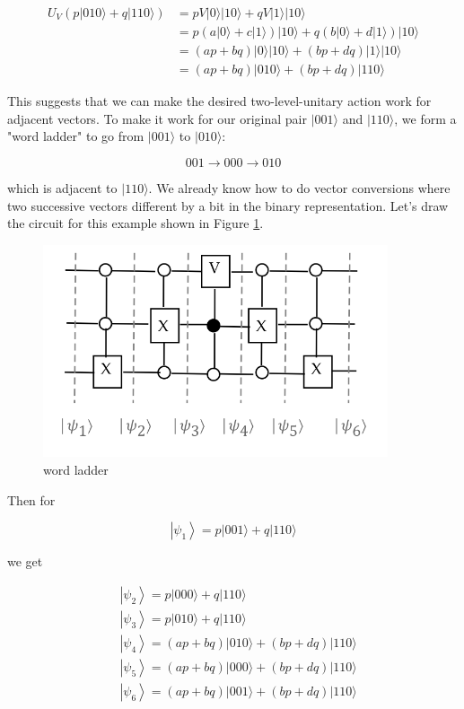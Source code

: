 \documentclass[main.tex]{subfiles}
\begin{document}
    $$
    \begin{aligned}
    U_{V}(p|010\rangle+q|110\rangle) &=p V|0\rangle|10\rangle+q V|1\rangle|10\rangle \\
    &=p(a|0\rangle+c|1\rangle)|10\rangle+q(b|0\rangle+d|1\rangle)|10\rangle \\
    &=(a p+b q)|0\rangle|10\rangle+(b p+d q)|1\rangle|10\rangle \\
    &=(a p+b q)|010\rangle+(b p+d q)|110\rangle
    \end{aligned}
    $$
    
    This suggests that we can make the desired two-level-unitary action work for adjacent vectors. To make it work for our original pair $|001\rangle$ and $|110\rangle$, we form a "word ladder" to go from $|001\rangle$ to $|010\rangle$:
    
    $$
    001 \rightarrow 000 \rightarrow 010
    $$
    
    which is adjacent to $|110\rangle$. We already know how to do vector conversions where two successive vectors different by a bit in the binary representation. Let's draw the circuit for this example shown in Figure \ref{fig:19multicontrol4}.
    
    \begin{figure}
        \centering
        \includegraphics[width=4in]{notes/figs/n09/19multicontrol4.png}
        \caption{word ladder}
        \label{fig:19multicontrol4}
    \end{figure}
    
    Then for
    
    $$
    \left|\psi_{1}\right\rangle=p|001\rangle+q|110\rangle
    $$
    
    we get
    
    $$
    \begin{aligned}
    &\left|\psi_{2}\right\rangle=p|000\rangle+q|110\rangle \\
    &\left|\psi_{3}\right\rangle=p|010\rangle+q|110\rangle \\
    &\left|\psi_{4}\right\rangle=(a p+b q)|010\rangle+(b p+d q)|110\rangle \\
    &\left|\psi_{5}\right\rangle=(a p+b q)|000\rangle+(b p+d q)|110\rangle \\
    &\left|\psi_{6}\right\rangle=(a p+b q)|001\rangle+(b p+d q)|110\rangle
    \end{aligned}
    $$
    
\end{document}
